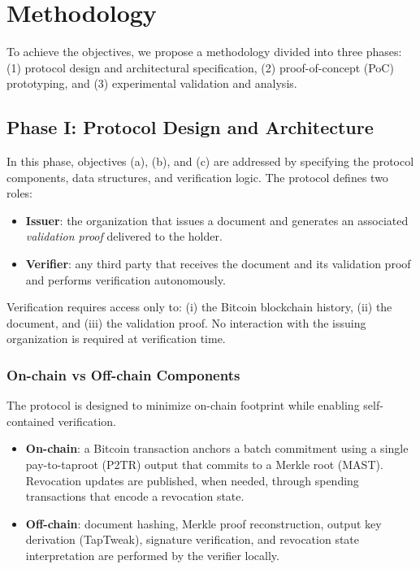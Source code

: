 \section{Methodology}
\label{methodology}

To achieve the objectives, we propose a methodology divided into three phases:
(1) protocol design and architectural specification,
(2) proof-of-concept (PoC) prototyping, and
(3) experimental validation and analysis.

\subsection{Phase I: Protocol Design and Architecture}

In this phase, objectives (a), (b), and (c) are addressed by specifying the protocol components, data structures, and verification logic.
The protocol defines two roles:

\begin{itemize}
    \item \textbf{Issuer}: the organization that issues a document and generates an associated \emph{validation proof} delivered to the holder.
    \item \textbf{Verifier}: any third party that receives the document and its validation proof and performs verification autonomously.
\end{itemize}

Verification requires access only to: (i) the Bitcoin blockchain history, (ii) the document, and (iii) the validation proof.
No interaction with the issuing organization is required at verification time.

\subsubsection{On-chain vs Off-chain Components}

The protocol is designed to minimize on-chain footprint while enabling self-contained verification.

\begin{itemize}
    \item \textbf{On-chain}: a Bitcoin transaction anchors a batch commitment using a single pay-to-taproot (P2TR) output that commits to a Merkle root (MAST). Revocation updates are published, when needed, through spending transactions that encode a revocation state.
    \item \textbf{Off-chain}: document hashing, Merkle proof reconstruction, output key derivation (TapTweak), signature verification, and revocation state interpretation are performed by the verifier locally.
\end{itemize}

